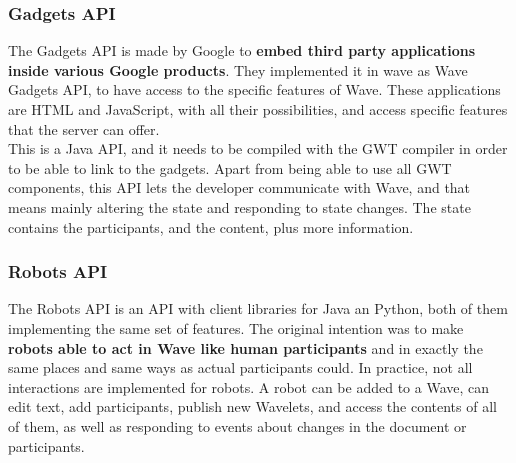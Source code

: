 \subsubsection{Gadgets API}
The Gadgets API \cite{ref:gadgets_api} is made by Google to \textbf{embed third party applications inside various Google products}. They implemented it in wave as Wave Gadgets API, to have access to the specific features of Wave. These applications are HTML and JavaScript, with all their possibilities, and access specific features that the server can offer.\\[.2cm]
This is a Java API, and it needs to be compiled with the GWT compiler in order to be able to link to the gadgets. Apart from being able to use all GWT components, this API lets the developer communicate with Wave, and that means mainly altering the state and responding to state changes. The state contains the participants, and the content, plus more information.

\subsubsection{Robots API}
The Robots API \cite{ref:robots_api} is an API with client libraries for Java an Python, both of them implementing the same set of features. The original intention was to make \textbf{robots able to act in Wave like human participants} and in exactly the same places and same ways as actual participants could. In practice, not all interactions are implemented for robots. A robot can be added to a Wave, can edit text, add participants, publish new Wavelets, and access the contents of all of them, as well as responding to events about changes in the document or participants.

